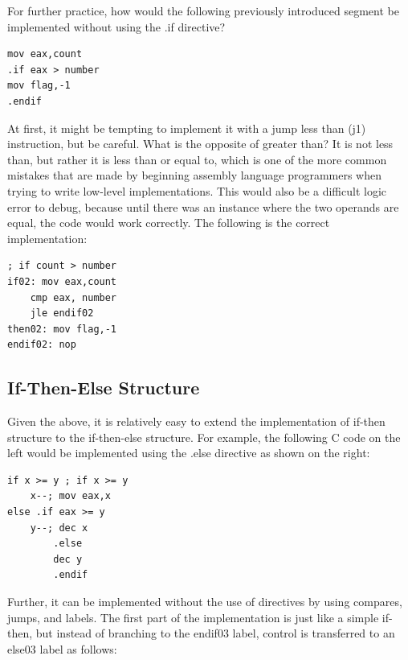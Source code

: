 \documentclass[10pt]{book}
\begin{document}
For further practice, how would the following previously introduced segment be implemented without using the .if directive?


\begin{verbatim}
mov eax,count
.if eax > number
mov flag,-1
.endif
\end{verbatim}

At first, it might be tempting to implement it with a jump less than (j1) instruction, but be careful. What is the opposite of greater than? It is not less than, but rather it is less than or equal to, which is one of the more common mistakes that are made by beginning assembly language programmers when trying to write low-level implementations. This would also be a difficult logic error to debug, because until there was an instance where the two operands are equal, the code would work correctly. The following is the correct implementation:

\begin{verbatim}
; if count > number
if02: mov eax,count
    cmp eax, number
    jle endif02
then02: mov flag,-1
endif02: nop
\end{verbatim}

\subsection{If-Then-Else Structure}
Given the above, it is relatively easy to extend the implementation of if-then structure to the if-then-else structure. For example, the following C code on the left would be implemented using the .else directive as shown on the right:

\begin{verbatim}
if x >= y ; if x >= y
    x--; mov eax,x
else .if eax >= y
    y--; dec x
        .else
        dec y
        .endif
\end{verbatim}

Further, it can be implemented without the use of directives by using compares, jumps, and labels. The first part of the implementation is just like a simple if-then, but instead of branching to the endif03 label, control is transferred to an else03 label as follows:
\end{document}
